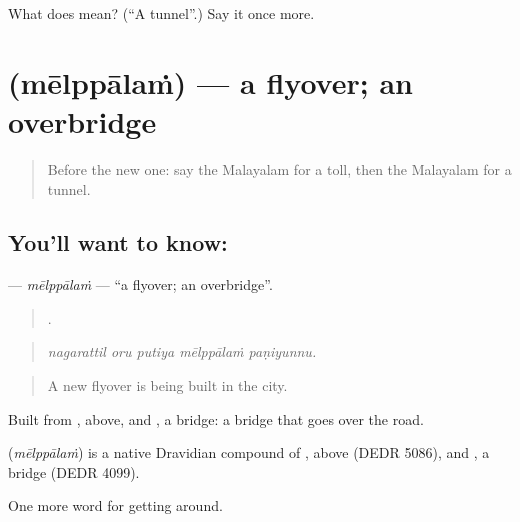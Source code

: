 \begin{tcolorbox}[breakable,colback=teal!4,colframe=teal!35!black,title={Before you move on}]
What does  mean? (\textquotedblleft{}A tunnel\textquotedblright{}.) Say it once more.
\end{tcolorbox}
\section[\texorpdfstring{\ml{മേൽപ്പാലം} (mēlppālaṁ)}{മേൽപ്പാലം (mēlppālaṁ)}]{ (mēlppālaṁ) — a flyover; an overbridge}

\label{lesson:ML-C468-melppalam}



\begin{quote}
Before the new one: say the Malayalam for a toll, then the Malayalam for a tunnel.
\end{quote}

\subsection*{You'll want to know: }
\textbf{} — \emph{mēlppālaṁ} — \textquotedblleft{}a flyover; an overbridge\textquotedblright{}.

\begin{quote}
    .
\end{quote}

\begin{quote}
\emph{nagarattil oru putiya mēlppālaṁ paṇiyunnu.}
\end{quote}

\begin{quote}
A new flyover is being built in the city.
\end{quote}

Built from , above, and , a bridge: a bridge that goes over the road.

\begin{cousinweb}
\textbf{} (\emph{mēlppālaṁ}) is a native Dravidian compound of , above (DEDR 5086), and , a bridge (DEDR 4099).
\end{cousinweb}

\begin{grammarlens}[title={What you've built}]
One more word for getting around.
\end{grammarlens}

